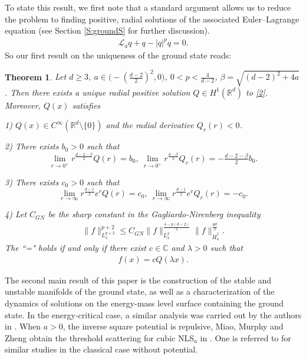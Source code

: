 \documentclass[12pt]{amsart}
\newcommand{\R}{\mathbb R}
\newcommand{\dha}{\dot H^1_a}
\newcommand{\la}{\mathcal L_a}
\newtheorem{theorem}{Theorem}[section]
\begin{document}
  To state this result, we first note that a standard argument allows us to reduce the problem to finding positive, radial solutions of the associated Euler–Lagrange equation (see Section \ref{S:groundS} for further discussion).
  \begin{align}\label{2}
\la q+q-|q|^p q=0. 
\end{align}
  So our first result on the uniqueness of the ground state reads: 
  \begin{theorem}\label{thm: ground state}
Let $d\ge 3$, $a\in \big(-(\tfrac{d-2}2)^2,0\big)$, $0<p<\frac 4{d-2}$, $\beta=\sqrt{(d-2)^2+4a}$. Then there exists a unique radial positive solution $Q\in H^1(\R^d)$ to \eqref{2}. Moreover, $Q(x)$ satisfies 

1) $Q(x)\in C^{\infty}(\R^d \setminus \{0\})$ and the radial derivative $Q_r(r)<0$. 

2) There exists $b_0>0$ such that 
$$
\lim_{r\to 0^+} r^{\frac{d-2-\beta}2}Q(r)=b_0, \ \lim_{r\to 0^+} r^{\frac{d-\beta}2}Q_r(r)=-\tfrac{d-2-\beta}2 b_0. 
$$

3) There exists $c_0>0$ such that 
$$
\lim_{r\to \infty} r^{\frac{d-1}2}e^{r} Q(r)=c_0, \ \lim_{r\to \infty} r^{\frac{d-1}2}e^{r}Q_r(r)=-c_0. 
$$

4) Let $C_{GN}$ be the sharp constant in the Gagliardo-Nirenberg inequality 
\begin{align}\label{3}
\|f\|_{L_x^{p+2}}^{p+2}\le C_{GN} \|f\|_{L_x^2}^{\frac{4-p(d-2)}2}\|f\|_{\dha}^{\frac{pd}2}. 
\end{align}
The ``=" holds if and only if there exist $c\in \mathbb C$ and $\lambda>0$ such that 
\begin{align}
f(x)=cQ(\lambda x). 
\end{align}

\end{theorem}
  
      
    
    The second main result of this paper is the construction of the stable and unstable manifolds of the ground state, as well as a characterization of the dynamics of solutions on the energy-mass level surface containing the ground state. In the energy-critical case, a similar analysis was carried out by the authors in \cite{YZZ22}. When $a>0$, the inverse square potential is repulsive, Miao, Murphy and Zheng obtain the threshold scattering for cubic NLS$_a$ in \cite{MMZ23}. One is referred to  \cite{Bourgain, CFR22, DHR08, DM08, DM08a, DR10, KM06, LZ09, LZ11, SZ23, MMMZ25} for similar studies in the classical case without potential. 
\end{document}
